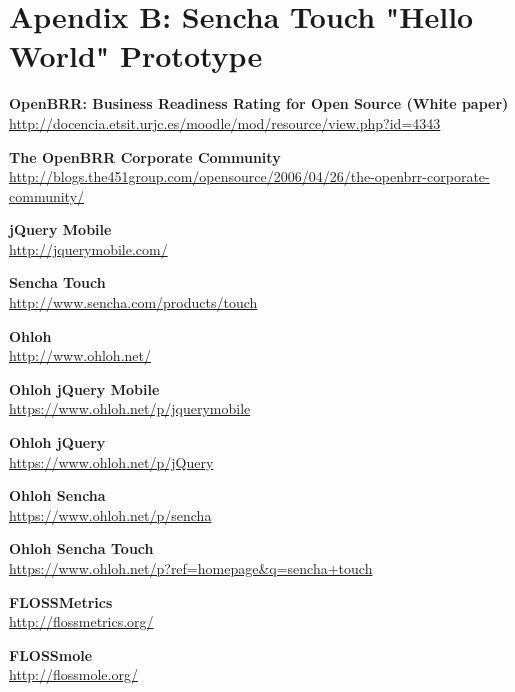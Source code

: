 \documentclass[a4paper,12pt]{book}
\begin{document}
\chapter{Apendix B: Sencha Touch "Hello World" Prototype}
\label{Apendix B: Sencha Touch "Hello World" Prototype}


\begin{thebibliography}{25}
 

\textbf{OpenBRR: Business Readiness Rating for
Open Source (White paper)}\\
{\footnotesize\url{
http://docencia.etsit.urjc.es/moodle/mod/resource/view.php?id=4343}}

\textbf{The OpenBRR Corporate Community}\\
{\footnotesize\url{http://blogs.the451group.com/opensource/2006/04/26/the-openbrr-corporate-community/}}

\textbf{jQuery Mobile}\\
{\footnotesize\url{http://jquerymobile.com/}}

\textbf{Sencha Touch}\\
{\footnotesize\url{http://www.sencha.com/products/touch}}

\textbf{Ohloh}\\
{\footnotesize\url{http://www.ohloh.net/}}

\textbf{Ohloh jQuery Mobile}\\
{\footnotesize\url{https://www.ohloh.net/p/jquerymobile}}

\textbf{Ohloh jQuery}\\
{\footnotesize\url{https://www.ohloh.net/p/jQuery}}

\textbf{Ohloh Sencha}\\
{\footnotesize\url{https://www.ohloh.net/p/sencha}}

\textbf{Ohloh Sencha Touch}\\
{\footnotesize\url{https://www.ohloh.net/p?ref=homepage\&q=sencha+touch}}

\textbf{FLOSSMetrics}\\
{\footnotesize\url{http://flossmetrics.org/}}

\textbf{FLOSSmole}\\
{\footnotesize\url{http://flossmole.org/}}


\end{thebibliography}
\end{document}
